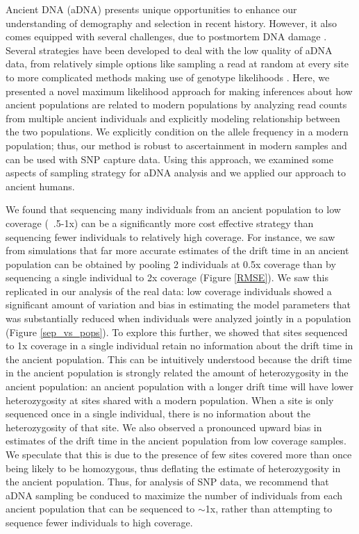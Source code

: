 \documentclass[11pt, oneside]{article}   	%
\begin{document}
Ancient DNA (aDNA) presents unique opportunities to enhance our understanding of demography and selection in recent history. However, it also comes equipped with several challenges, due to postmortem DNA damage \citep{sawyer2012temporal}. Several strategies have been developed to deal with the low quality of aDNA data, from relatively simple options like sampling a read at random at every site \citep{green2010draft} to more complicated methods making use of genotype likelihoods \citep{racimo2016joint}. Here, we presented a novel maximum likelihood approach for making inferences about how ancient populations are related to modern populations by analyzing read counts from multiple ancient individuals and explicitly modeling relationship between the two populations. We explicitly condition on the allele frequency in a modern population; thus, our method is robust to ascertainment in modern samples and can be used with SNP capture data. Using this approach, we examined some aspects of sampling strategy for aDNA analysis and we applied our approach to ancient humans.

We found that sequencing many individuals from an ancient population to low coverage (~.5-1x) can be a significantly more cost effective strategy than sequencing fewer individuals to relatively high coverage. For instance, we saw from simulations that far more accurate estimates of the drift time in an ancient population can be obtained by pooling 2 individuals at 0.5x coverage than by sequencing a single individual to 2x coverage (Figure \ref{RMSE}). We saw this replicated in our analysis of the real data: low coverage individuals showed a significant amount of variation and bias in estimating the model parameters that was substantially reduced when individuals were analyzed jointly in a population (Figure \ref{sep_vs_pops}). To explore this further, we showed that sites sequenced to 1x coverage in a single individual retain no information about the drift time in the ancient population. This can be intuitively understood because the drift time in the ancient population is strongly related the amount of heterozygosity in the ancient population: an ancient population with a longer drift time will have lower heterozygosity at sites shared with a modern population. When a site is only sequenced once in a single individual, there is no information about the heterozygosity of that site. We also observed a pronounced upward bias in estimates of the drift time in the ancient population from low coverage samples. We speculate that this is due to the presence of few sites covered more than once being likely to be homozygous, thus deflating the estimate of heterozygosity in the ancient population. Thus, for analysis of SNP data, we recommend that aDNA sampling be conduced to maximize the number of individuals from each ancient population that can be sequenced to $\sim$1x, rather than attempting to sequence fewer individuals to high coverage.
\end{document}
